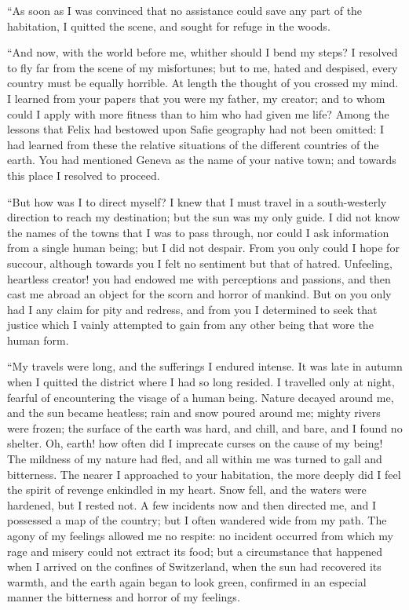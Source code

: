 ``As soon as I was convinced that
no assistance could save any part of the
habitation, I quitted the scene, and
sought for refuge in the woods.

``And now, with the world before
me, whither should I bend my steps? I
resolved to fly far from the scene of my
misfortunes; but to me, hated and despised,
every country must be equally
horrible. At length the thought of
you crossed my mind. I learned from
your papers that you were my father, my
creator; and to whom could I apply with
more fitness than to him who had given
me life? Among the lessons that Felix
had bestowed upon Safie geography
had not been omitted: I had learned
from these the relative situations of the
different countries of the earth. You
had mentioned Geneva as the name of
your native town; and towards this
place I resolved to proceed.

``But how was I to direct myself?
I knew that I must travel in a south-westerly
direction to reach my destination;
but the sun was my only guide.
I did not know the names of the towns
that I was to pass through, nor could
I ask information from a single human
being; but I did not despair. From
you only could I hope for succour, although
towards you I felt no sentiment
but that of hatred. Unfeeling, heartless
creator! you had endowed me
with perceptions and passions, and then
cast me abroad an object for the scorn
and horror of mankind. But on you
only had I any claim for pity and redress,
and from you I determined to
seek that justice which I vainly attempted
to gain from any other being
that wore the human form.

``My travels were long, and the sufferings
I endured intense. It was late
in autumn when I quitted the district
where I had so long resided. I travelled
only at night, fearful of encountering
the visage of a human being.
Nature decayed around me, and the
sun became heatless; rain and snow
poured around me; mighty rivers were
frozen; the surface of the earth was
hard, and chill, and bare, and I found no
shelter. Oh, earth! how often did I imprecate
curses on the cause of my being!
The mildness of my nature had fled,
and all within me was turned to gall and
bitterness. The nearer I approached to
your habitation, the more deeply did I
feel the spirit of revenge enkindled in
my heart. Snow fell, and the waters
were hardened, but I rested not. A
few incidents now and then directed
me, and I possessed a map of the country;
but I often wandered wide from
my path. The agony of my feelings
allowed me no respite: no incident
occurred from which my rage and misery
could not extract its food; but a
circumstance that happened when I
arrived on the confines of Switzerland,
when the sun had recovered its warmth,
and the earth again began to look
green, confirmed in an especial manner
the bitterness and horror of my
feelings.

